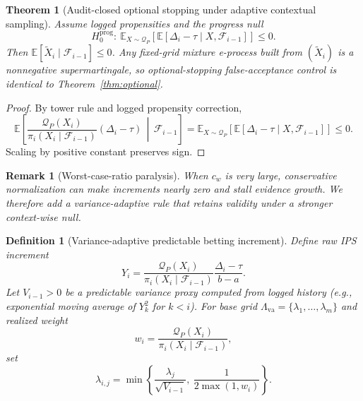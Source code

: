 \documentclass[11pt,a4paper]{article}
\newtheorem{theorem}{Theorem}[section]
\newtheorem{definition}{Definition}[section]
\newtheorem{remark}{Remark}[section]
\begin{document}
\begin{theorem}[Audit-closed optional stopping under adaptive contextual sampling]
\label{thm:adaptive-optional}
Assume logged propensities and the progress null
\[
H_0^{\mathrm{prog}}:\ \mathbb{E}_{X\sim \mathcal{Q}_P}\!\left[\mathbb{E}[\Delta_i-\tau\mid X,\mathcal{F}_{i-1}]\right]\le 0.
\]
Then $\mathbb{E}[\widetilde X_i\mid\mathcal{F}_{i-1}]\le 0$.
Any fixed-grid mixture e-process built from $(\widetilde X_i)$ is a nonnegative supermartingale, so optional-stopping false-acceptance control is identical to Theorem~\ref{thm:optional}.
\end{theorem}
\begin{proof}
By tower rule and logged propensity correction,
\[
\mathbb{E}\!\left[
\frac{\mathcal{Q}_P(X_i)}{\pi_i(X_i\mid\mathcal{F}_{i-1})}
(\Delta_i-\tau)\,\middle|\,\mathcal{F}_{i-1}
\right]
=
\mathbb{E}_{X\sim\mathcal{Q}_P}\!\left[\mathbb{E}[\Delta_i-\tau\mid X,\mathcal{F}_{i-1}]\right]\le 0.
\]
Scaling by positive constant preserves sign.
\end{proof}

\begin{remark}[Worst-case-ratio paralysis]
When $c_w$ is very large, conservative normalization can make increments nearly zero and stall evidence growth.
We therefore add a variance-adaptive rule that retains validity under a stronger context-wise null.
\end{remark}

\begin{definition}[Variance-adaptive predictable betting increment]
Define raw IPS increment
\[
Y_i=
\frac{\mathcal{Q}_P(X_i)}{\pi_i(X_i\mid\mathcal{F}_{i-1})}
\frac{\Delta_i-\tau}{b-a}.
\]
Let $V_{i-1}>0$ be a predictable variance proxy computed from logged history (e.g., exponential moving average of $Y_k^2$ for $k<i$).
For base grid $\Lambda_{\mathrm{va}}=\{\lambda_1,\dots,\lambda_m\}$ and realized weight
\[
w_i=\frac{\mathcal{Q}_P(X_i)}{\pi_i(X_i\mid\mathcal{F}_{i-1})},
\]
set
\[
\lambda_{i,j}=\min\!\left\{\frac{\lambda_j}{\sqrt{V_{i-1}}},\ \frac{1}{2\max(1,w_i)}\right\}.
\]
\end{definition}
\end{document}
